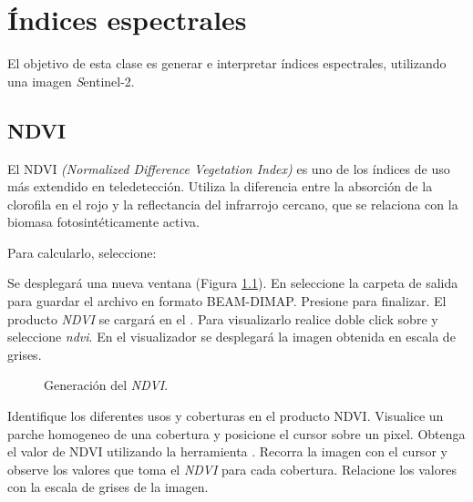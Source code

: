 \chapter{Índices espectrales}

El objetivo de esta clase es generar e interpretar índices espectrales, utilizando una imagen \emph Sentinel-2.


\section{NDVI}
El NDVI \emph{(Normalized Difference Vegetation Index)} es uno de los índices de uso más extendido en teledetección. Utiliza la diferencia entre la absorción de la clorofila en el rojo y la reflectancia del infrarrojo cercano, que se relaciona con la biomasa fotosintéticamente activa.

Para calcularlo, seleccione:

\begin{center}
\end{center}

Se desplegará una nueva ventana (Figura \ref{fig:NDVI}). En  seleccione la carpeta de salida para guardar el archivo en formato BEAM-DIMAP. Presione  para finalizar. El producto \emph{NDVI} se cargará en el . Para visualizarlo realice doble click sobre  y seleccione \emph{ndvi}. En el visualizador se desplegará la imagen obtenida en escala de grises.

\begin{figure}[h!]
    \centering
    \hspace{1cm}
    \caption{Generación del \emph{NDVI}.}
    \label{fig:NDVI}
\end{figure}

Identifique los diferentes usos y coberturas en el producto NDVI. Visualice un parche homogeneo de una cobertura y posicione el cursor sobre un pixel. Obtenga el valor de NDVI utilizando la herramienta  . Recorra la imagen con el cursor y observe los valores que toma el \emph{NDVI} para cada cobertura. Relacione los valores con la escala de grises de la imagen.


